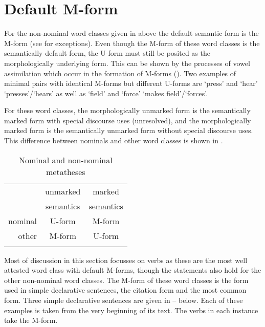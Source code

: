\section{Default M-form}\label{sec:DefFor1}
For the non-nominal word classes given in  above
the default semantic form is the M-form
(see  for exceptions).
Even though the M-form of these word classes is the semantically default form,
the U-form must still be posited as the morphologically underlying form.
This can be shown by the processes of vowel assimilation which occur
in the formation of M-forms ().
Two examples of minimal pairs with identical M-forms but different U-forms are
 `press' and  `hear' {\ra}  `presses'/`hears'
as well as  `field' and  `force' {\ra}
 `makes field'/`forces'.

For these word classes, the morphologically unmarked form
is the semantically marked form with special discourse uses (unresolved),
and the morphologically marked form is the semantically unmarked form without special discourse uses.
This difference between nominals and other word classes is shown in .

\begin{table}[h]
	\caption{Nominal and non-nominal metatheses}\label{tab:NomVerMet}
	\centering
		\begin{tabular}{rcc} \lsptoprule
							& unmarked	& marked\\
							& semantics	& semantics\\ \midrule
			nominal	& U-form		& M-form \\
			other		& M-form		& U-form \\ \lspbottomrule
		\end{tabular}
\end{table}

Most of discussion in this section focusses on verbs
as these are the most well attested word class with default M-forms,
though the statements also hold for the other non-nominal word classes.
The M-form of these word classes is the form used in simple declarative sentences,
the citation form and the most common form.
Three simple declarative sentences
are given in -- below.
Each of these examples is taken from the very beginning of its text.
The verbs in each instance take the M-form.

